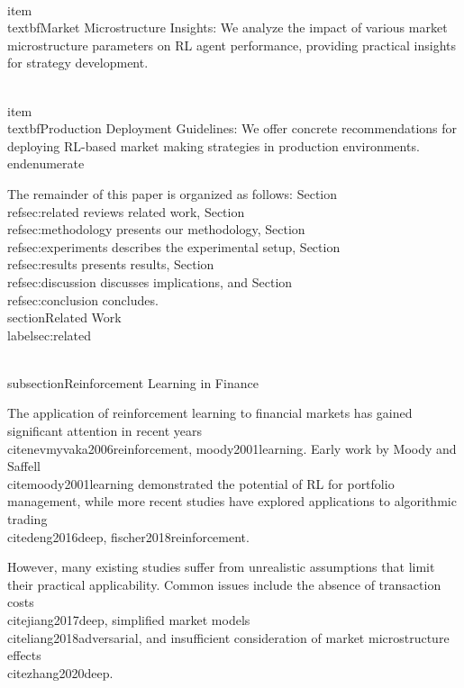 \documentclass[11pt,a4paper]{article}
\begin{document}
\\item \\textbf{Market Microstructure Insights}: We analyze the impact of various market microstructure parameters on RL agent performance, providing practical insights for strategy development.

\\item \\textbf{Production Deployment Guidelines}: We offer concrete recommendations for deploying RL-based market making strategies in production environments.
\\end{enumerate}

The remainder of this paper is organized as follows: Section~\\ref{sec:related} reviews related work, Section~\\ref{sec:methodology} presents our methodology, Section~\\ref{sec:experiments} describes the experimental setup, Section~\\ref{sec:results} presents results, Section~\\ref{sec:discussion} discusses implications, and Section~\\ref{sec:conclusion} concludes.
\n\n
\\section{Related Work}
\\label{sec:related}

\\subsection{Reinforcement Learning in Finance}

The application of reinforcement learning to financial markets has gained significant attention in recent years~\\cite{nevmyvaka2006reinforcement, moody2001learning}. Early work by Moody and Saffell~\\cite{moody2001learning} demonstrated the potential of RL for portfolio management, while more recent studies have explored applications to algorithmic trading~\\cite{deng2016deep, fischer2018reinforcement}.

However, many existing studies suffer from unrealistic assumptions that limit their practical applicability. Common issues include the absence of transaction costs~\\cite{jiang2017deep}, simplified market models~\\cite{liang2018adversarial}, and insufficient consideration of market microstructure effects~\\cite{zhang2020deep}.
\end{document}
